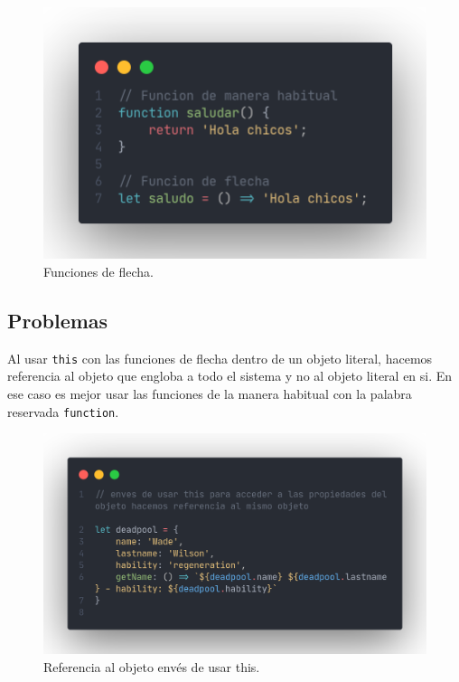 \documentclass[12pt]{article}
\begin{document}
\begin{figure}[H]
	\centering
	\includegraphics[scale=.2]{assets/images/funcion-flecha-1.png}
	\caption{Funciones de flecha.}
\end{figure}
		
\subsection{Problemas}

Al usar \lstinline{this} con las funciones de flecha dentro de un objeto literal, hacemos referencia al objeto que engloba a todo el sistema y no al objeto literal en si. En ese caso es mejor usar las funciones de la manera habitual con la palabra reservada \lstinline{function}.

\begin{figure}[H]
	\centering
	\includegraphics[scale=0.2]{assets/images/funcion-flecha-2.png}
	\caption{Referencia al objeto envés de usar this.}
\end{figure}
		
\end{document}
